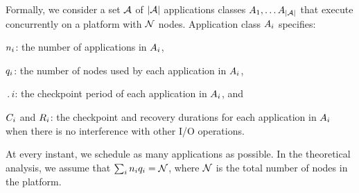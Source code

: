 Formally, we consider a set ${\mathcal A}$ of $|{\mathcal A}|$ applications classes
$A_{1}, \ldots A_{|{\mathcal A}|}$ that execute concurrently on a platform with
${\mathcal N}$ nodes. Application class $A_{i}$ specifies:
\begin{compactitem}
\item $n_{i}$: the number of applications in $A_{i}$,
\item $q_{i}$: the number of nodes used by each application in $A_{i}$,
\item $\period{i}$: the checkpoint period of each application in $A_{i}$, and
\item $C_{i}$ and $R_{i}$: the checkpoint and recovery durations for each application in $A_{i}$ when there is no interference with other I/O operations.
\end{compactitem}
%
%
At every instant, we schedule as many applications as possible.
In the theoretical analysis, we assume that
$\sum_{i}n_{i} q_{i} = {\mathcal N}$, where ${\mathcal N}$ is the total
number of nodes in the platform.


